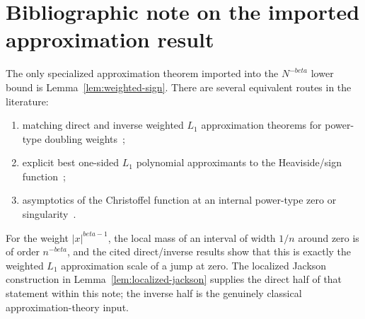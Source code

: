 \documentclass[11pt]{article}
\def\beta{beta}%
\begin{document}
\section{Bibliographic note on the imported approximation result}

The only specialized approximation theorem imported into the $N^{-\beta}$ lower bound is Lemma~\ref{lem:weighted-sign}.  There are several equivalent routes in the literature:
\begin{enumerate}[label=(\alph*)]
\item matching direct and inverse weighted $L_1$ approximation theorems for power-type doubling weights~\cite{Kopotun};
\item explicit best one-sided $L_1$ polynomial approximants to the Heaviside/sign function~\cite{BustamanteEtAl};
\item asymptotics of the Christoffel function at an internal power-type zero or singularity~\cite{DankaTotik}.
\end{enumerate}
For the weight $|x|^{\beta-1}$, the local mass of an interval of width $1/n$ around zero is of order $n^{-\beta}$, and the cited direct/inverse results show that this is exactly the weighted $L_1$ approximation scale of a jump at zero.  The localized Jackson construction in Lemma~\ref{lem:localized-jackson} supplies the direct half of that statement within this note; the inverse half is the genuinely classical approximation-theory input.
\end{document}
